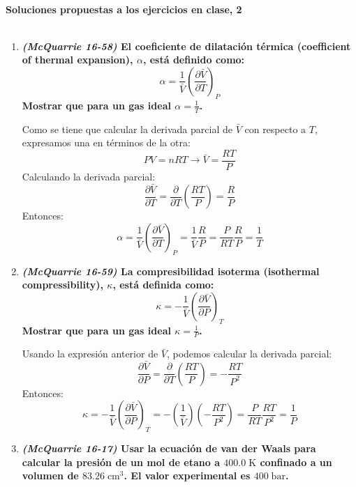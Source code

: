 \documentclass[a4paper,12pt]{article}
\begin{document}

\begin{center}
\HRule \\[0.4cm]
{ \bfseries Soluciones propuestas a los ejercicios en clase, 2}\\ %
\HRule \\[0.4cm]
\end{center}


\begin{enumerate}

 \item \textbf{\textit{(McQuarrie 16-58)} El coeficiente de dilataci\'on t\'ermica (coefficient of thermal expansion), $\alpha$, est\'a definido como:
$$\alpha=\frac{1}{\bar{V}}\left(\frac{\partial \bar{V}}{\partial T}\right)_P$$
Mostrar que para un gas ideal $\alpha=\frac{1}{T}$.} %

Como se tiene que calcular la derivada parcial de $\bar{V}$ con respecto a $T$, expresamos una en t\'erminos de la otra:
$$PV=nRT\rightarrow \bar{V}=\frac{RT}{P}$$
Calculando la derivada parcial:
$$\frac{\partial \bar{V}}{\partial T}=\frac{\partial }{\partial T}\left(\frac{RT}{P}\right)=\frac{R}{P}$$
Entonces:
$$\alpha=\frac{1}{\bar{V}}\left(\frac{\partial \bar{V}}{\partial T}\right)_P=\frac{1}{\bar{V}}\frac{R}{P}=\frac{P}{RT}\frac{R}{P}=\frac{1}{T}$$

 \item \textbf{\textit{(McQuarrie 16-59)} La compresibilidad isoterma (isothermal compressibility), $\kappa$, est\'a definida como:
$$\kappa=-\frac{1}{\bar{V}}\left(\frac{\partial \bar{V}}{\partial P}\right)_T$$
Mostrar que para un gas ideal $\kappa=\frac{1}{P}$.} %

Usando la expresi\'on anterior de $\bar{V}$, podemos calcular la derivada parcial:
$$\frac{\partial \bar{V}}{\partial P}=\frac{\partial }{\partial T}\left(\frac{RT}{P}\right)=-\frac{RT}{P^2}$$
Entonces:
$$\kappa=-\frac{1}{\bar{V}}\left(\frac{\partial \bar{V}}{\partial P}\right)_T=-\left(\frac{1}{\bar{V}}\right)\left(-\frac{RT}{P^2}\right)=\frac{P}{RT}\frac{RT}{P^2}=\frac{1}{P}$$

\newpage

 \item \textbf{\textit{(McQuarrie 16-17)} Usar la ecuaci\'on de van der Waals para calcular la presi\'on de un mol de etano a $400.0\;\mbox{K}$ confinado a un volumen de $83.26\;\mbox{cm}^3$. El valor experimental es $400\;\mbox{bar}$.} %


\end{enumerate}
\end{document}
